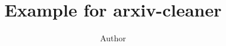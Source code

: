 \documentclass[twocolumn]{article}
\title{Example for arxiv-cleaner}
\author{Author}
\begin{document}
\maketitle













\renewcommand{\appendixpagename}{\huge Appendices}

\appendixpage


\end{document}
